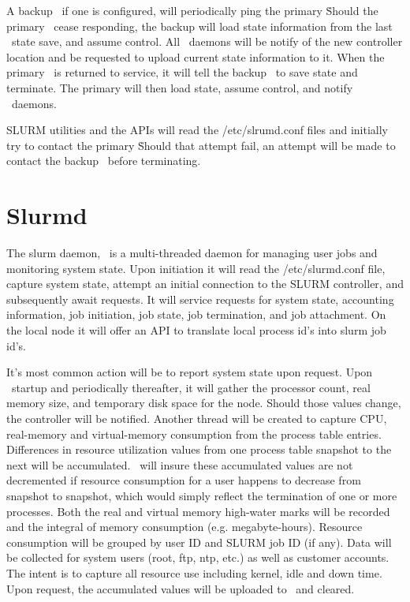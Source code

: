 A backup \slurmctld\, if one is configured, will periodically ping
the primary \slurmctld\.  Should the primary \slurmctld\ cease
responding, the backup will load state information from the last 
\slurmctld\ state save, and assume control.  All \slurmd\ daemons
will be notify of the new controller location and be requested to upload
current state information to it.  When the primary \slurmctld\ is
returned to service, it will tell the backup \slurmctld\ to save
state and terminate.  The primary will then load state, assume control,
and notify \slurmd\ daemons.

SLURM utilities and the APIs will read the /etc/slrumd.conf files 
and initially try to contact the primary \slurmctld\. 
Should that attempt fail, an attempt will be made to contact the 
backup \slurmctld\ before terminating.

\section{Slurmd}

The slurm daemon, \slurmd\, is a multi-threaded daemon for managing
user jobs and monitoring system state.  Upon initiation it will read
the /etc/slurmd.conf file, capture system state, attempt an initial
connection to the SLURM controller, and subsequently await requests.
It will service requests for system state, accounting information,
job initiation, job state, job termination, and job attachment. On the
local node it will offer an API to translate local process id's into
slurm job id's. 

It's most common action will be to report system state upon request. Upon
\slurmd\ startup and periodically thereafter, it will gather the processor
count, real memory size, and temporary disk space for the node. Should
those values change, the controller will be notified.  Another thread will
be created to capture CPU, real-memory and virtual-memory consumption from
the process table entries.  Differences in resource utilization values
from one process table snapshot to the next will be accumulated. \slurmd\ 
will insure these accumulated values are not decremented if resource
consumption for a user happens to decrease from snapshot to snapshot,
which would simply reflect the termination of one or more processes.
Both the real and virtual memory high-water marks will be recorded and
the integral of memory consumption (e.g. megabyte-hours).  Resource
consumption will be grouped by user ID and SLURM job ID (if any). Data
will be collected for system users (root, ftp, ntp, etc.) as well as
customer accounts. The intent is to capture all resource use including
kernel, idle and down time.  Upon request, the accumulated values will be
uploaded to \slurmctld\ and cleared.  

